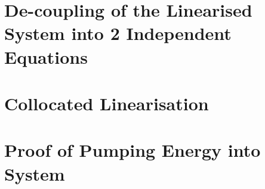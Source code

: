 \documentclass[a4paper,12pt]{article}
\begin{document}
\begin{appendices}
		\section{De-coupling of the Linearised System into 2 Independent Equations}
		
		\newpage
		\section{Collocated Linearisation}
		\newpage
		\section{Proof of Pumping Energy into System}
	\end{appendices}
	
\end{document}
